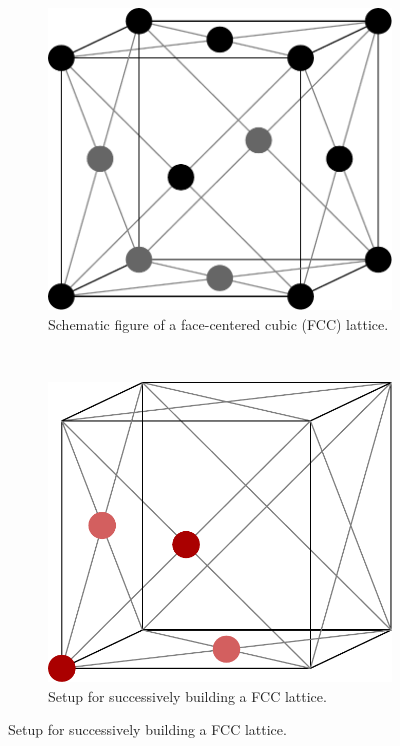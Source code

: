 \documentclass[12pt]{article}
\begin{document}
\begin{figure}[h]
    \begin{center}
        \begin{subfigure}[t]{0.4\textwidth}
            \includegraphics[scale=0.3]{images/fcc-2.pdf}
            \caption{Schematic figure of a face-centered cubic (FCC) lattice.}
            \label{fig:fcc}
        \end{subfigure} 
        \
        \begin{subfigure}[t]{0.4\textwidth}
            \includegraphics[scale=0.3]{images/unit_cell.pdf}
            \caption{Setup for successively building a FCC lattice.}
            \label{fig:unitcell}
        \end{subfigure}
    \end{center}
\end{figure}
\end{document}
